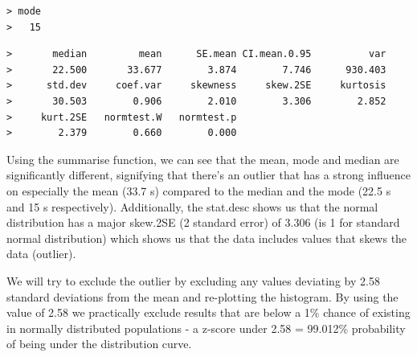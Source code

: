 \documentclass[]{article}
\newenvironment{Shaded}{\begin{snugshade}}{\end{snugshade}}
\newcommand{\ControlFlowTok}[1]{\textcolor[rgb]{0.13,0.29,0.53}{\textbf{#1}}}
\newcommand{\DataTypeTok}[1]{\textcolor[rgb]{0.13,0.29,0.53}{#1}}
\newcommand{\DecValTok}[1]{\textcolor[rgb]{0.00,0.00,0.81}{#1}}
\newcommand{\KeywordTok}[1]{\textcolor[rgb]{0.13,0.29,0.53}{\textbf{#1}}}
\newcommand{\NormalTok}[1]{#1}
\newcommand{\OperatorTok}[1]{\textcolor[rgb]{0.81,0.36,0.00}{\textbf{#1}}}
\newcommand{\StringTok}[1]{\textcolor[rgb]{0.31,0.60,0.02}{#1}}
\begin{document}
\begin{Shaded}
\end{Shaded}

\begin{verbatim}
> mode 
>   15
\end{verbatim}

\begin{Shaded}
\end{Shaded}

\begin{verbatim}
>       median         mean      SE.mean CI.mean.0.95          var 
>       22.500       33.677        3.874        7.746      930.403 
>      std.dev     coef.var     skewness     skew.2SE     kurtosis 
>       30.503        0.906        2.010        3.306        2.852 
>     kurt.2SE   normtest.W   normtest.p 
>        2.379        0.660        0.000
\end{verbatim}

Using the summarise function, we can see that the mean, mode and median are significantly different, signifying that there's an outlier that has a strong influence on especially the mean (33.7 s) compared to the median and the mode (22.5 s and 15 s respectively). Additionally, the stat.desc shows us that the normal distribution has a major skew.2SE (2 standard error) of 3.306 (is 1 for standard normal distribution) which shows us that the data includes values that skews the data (outlier).

We will try to exclude the outlier by excluding any values deviating by 2.58 standard deviations from the mean and re-plotting the histogram. By using the value of 2.58 we practically exclude results that are below a 1\% chance of existing in normally distributed populations - a z-score under 2.58 = 99.012\% probability of being under the distribution curve.
\end{document}
